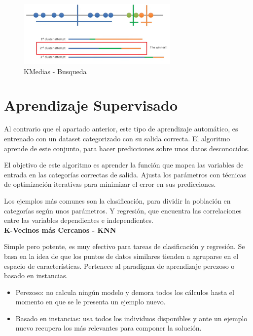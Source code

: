 \vspace{0.1cm}

\begin{figure}[!h]
	\centering
	\includegraphics[width=0.7\textwidth]{images/chapter_2/kmedias}
	\caption{KMedias - Busqueda}
	\label{fig:kmediasBusqueda}
\end{figure}


\section{Aprendizaje Supervisado}
Al contrario que el apartado anterior, este tipo de aprendizaje automático, es entrenado con un dataset categorizado con su salida correcta. El algoritmo aprende de este conjunto, para hacer predicciones sobre unos datos desconocidos.

El objetivo de este algoritmo es aprender la función que mapea las variables de entrada en las categorías correctas de salida. Ajusta los parámetros con técnicas de optimización iterativas para minimizar el error en sus predicciones.

Los ejemplos más comunes son la clasificación, para dividir la población en categorías según unos parámetros. Y regresión, que encuentra las correlaciones entre las variables dependientes e independientes.\\

\noindent\textbf{K-Vecinos más Cercanos - KNN}

Simple pero potente, es muy efectivo para tareas de clasificación y regresión. Se basa en la idea de que los puntos de datos similares tienden a agruparse en el espacio de características. Pertenece al paradigma de aprendizaje perezoso o basado en instancias.

\begin{itemize}
	\item Perezoso: no calcula ningún modelo y demora todos los cálculos hasta el momento en que se le presenta un ejemplo nuevo.
	
	\item Basado en instancias: usa todos los individuos disponibles y ante un ejemplo nuevo recupera los más relevantes para componer la solución.	
\end{itemize}

